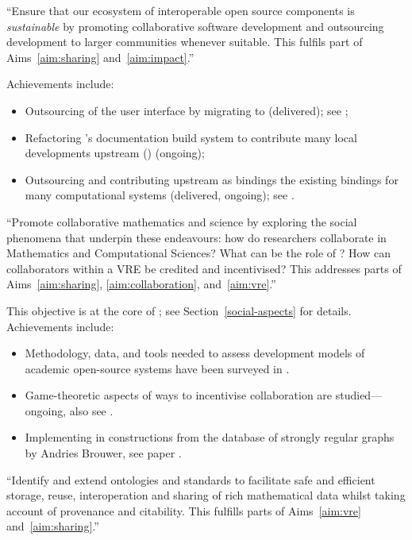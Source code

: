 \begin{compactenum}
\item \label{objective:sustainable} ``Ensure that our ecosystem of
  interoperable open source components is \emph{sustainable} by
  promoting collaborative software development and outsourcing
  development to larger communities whenever suitable. This fulfils
  part of Aims~\ref{aim:sharing} and~\ref{aim:impact}.''

  Achievements include:
  \begin{itemize}
  \item Outsourcing of the \Sage user interface by migrating to
    \Jupyter (delivered); see ;
  \item Refactoring \Sage's documentation build system to contribute
    many local developments upstream (\Sphinx)
     (ongoing);
  \item Outsourcing and contributing upstream as \Python bindings the
    existing \Sage bindings for many computational systems (delivered,
    ongoing); see .
  \end{itemize}

\item \label{objective:social} ``Promote collaborative mathematics and
  science by exploring the social phenomena that underpin these
  endeavours: how do researchers collaborate in Mathematics and
  Computational Sciences?  What can be the role of \VREs?  How can
  collaborators within a VRE be credited and incentivised? This
  addresses parts of Aims~\ref{aim:sharing}, \ref{aim:collaboration},
  and~\ref{aim:vre}.''

  This objective is at the core of ; see
  Section~\ref{social-aspects} for details.
  Achievements include:
  \begin{itemize}
  \item Methodology, data, and tools needed to assess
    development models of academic open-source systems have been surveyed in
    .
  \item Game-theoretic aspects of ways to incentivise
  collaboration are studied---ongoing, also see \cite{Pavlou:2016:MCI:2936924.2936934}.
  \item Implementing in \Sage constructions from the database of
  strongly regular graphs by Andries Brouwer, see paper \cite{2016arXiv160100181C}.
  \end{itemize}


\item \label{objective:data} ``Identify and extend ontologies and
  standards to facilitate safe and efficient storage, reuse,
  interoperation and sharing of rich mathematical data whilst taking
  account of provenance and citability. This fulfills parts of
  Aims~\ref{aim:vre} and~\ref{aim:sharing}.''


\end{compactenum}
